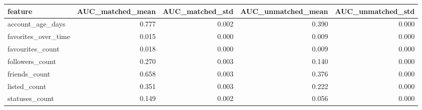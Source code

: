 \begin{tabular}{lrrrr}
\toprule
feature & AUC_matched_mean & AUC_matched_std & AUC_unmatched_mean & AUC_unmatched_std \\
\midrule
account_age_days & 0.777 & 0.002 & 0.390 & 0.000 \\
favorites_over_time & 0.015 & 0.000 & 0.009 & 0.000 \\
favourites_count & 0.018 & 0.000 & 0.009 & 0.000 \\
followers_count & 0.270 & 0.003 & 0.140 & 0.000 \\
friends_count & 0.658 & 0.003 & 0.376 & 0.000 \\
listed_count & 0.351 & 0.003 & 0.222 & 0.000 \\
statuses_count & 0.149 & 0.002 & 0.056 & 0.000 \\
\bottomrule
\end{tabular}
